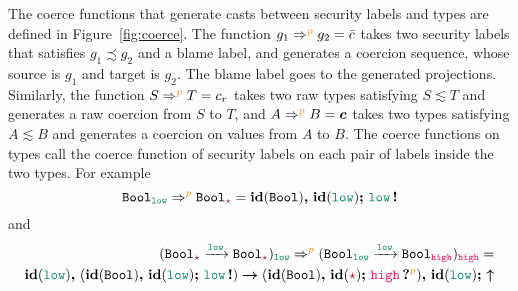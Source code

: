The coerce functions that generate casts between security labels and types are
defined in Figure~\ref{fig:coerce}. The function
$g_1\Rightarrow^{\bl{p}}g_2=\bar{c}$ takes two security labels that satisfies
$g_1 \precsim g_2$ and a blame label, and generates a coercion sequence, whose
source is $g_1$ and target is $g_2$. The blame label goes to the generated
projections. Similarly, the function $S \Rightarrow^{\bl{p}} T = c_r$ takes two
raw types satisfying $S \lesssim T$ and generates a raw coercion from $S$ to
$T$, and $A \Rightarrow^{\bl{p}} B = \bm{c}$ takes two types satisfying $A
\lesssim B$ and generates a coercion on values from $A$ to $B$. The coerce
functions on types call the coerce function of security labels on each pair of
labels inside the two types. For example
\[
\Bool_{\low} \Rightarrow^{\bl{p}} \Bool_{\unk} = \coerc{\id{\Bool}}{\id{\low}\seq\inj{\low}}
\]
and
\begin{align*}
(\Fun{\Bool_{\unk}}{\low}{\Bool_{\unk}})_{\low} \Rightarrow^{\bl{p}} (\Fun{\Bool_{\low}}{\low}{\Bool_{\high}})_{\high} = &\\
  \coerc{\funco{\id{\low}}{(\coerc{\id{\Bool}}{\id{\low} \seq \inj{\low}})}{(\coerc{\id{\Bool}}{\id{\unk} \seq \proj{\high}{p}})}}{\id{\low} \seq \up} &
\end{align*}


